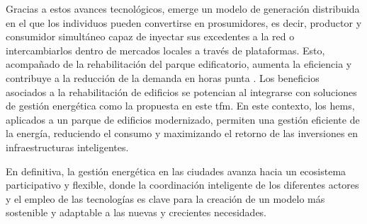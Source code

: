 \documentclass[11pt,a4paper]{book}
\begin{document}
Gracias a estos avances tecnológicos, emerge un modelo de generación distribuida en el que los individuos pueden convertirse en prosumidores, es decir, productor y consumidor simultáneo capaz de inyectar sus excedentes a la red o intercambiarlos dentro de mercados locales a través de plataformas. Esto, acompañado de la rehabilitación del parque edificatorio, aumenta la eficiencia y contribuye a la reducción de la demanda en horas punta \cite{smartcitycluster2025}. Los beneficios asociados a la rehabilitación de edificios se potencian al integrarse con soluciones de gestión energética como la propuesta en este \gls{tfm}. En este contexto, los \gls{hems}, aplicados a un parque de edificios modernizado, permiten una gestión eficiente de la energía, reduciendo el consumo y maximizando el retorno de las inversiones en infraestructuras inteligentes.

En definitiva, la gestión energética en las ciudades avanza hacia un ecosistema participativo y flexible, donde la coordinación inteligente de los diferentes actores y el empleo de las tecnologías es clave para la creación de un modelo más sostenible y adaptable a las nuevas y crecientes necesidades.
\end{document}
